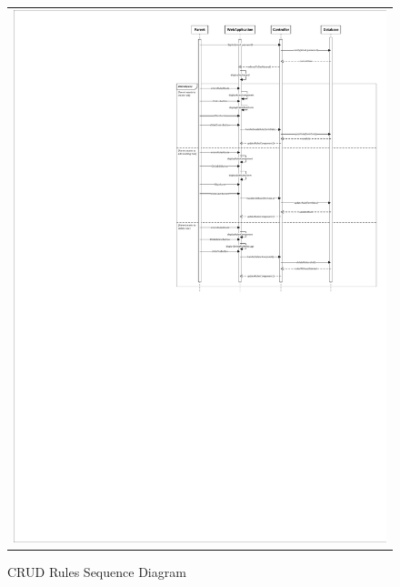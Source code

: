 \documentclass{sprawozdanie-agh}
\begin{document}
			\begin{figure}[H] 
				\centering
				\begin{tabular}{c}
					\includegraphics[width=.85\textwidth]{CRUDSequenceDiagram}
				\end{tabular} 
				\caption{CRUD Rules Sequence Diagram}
			\end{figure}
		
\end{document}
